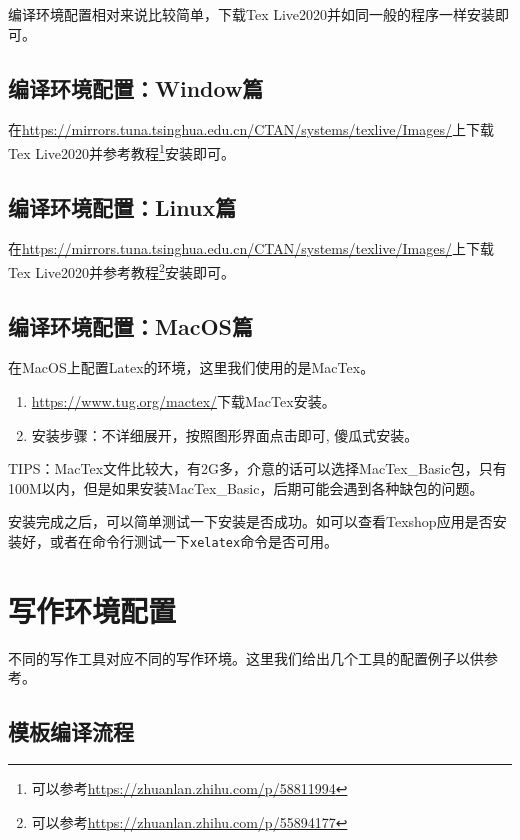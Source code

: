 编译环境配置相对来说比较简单，下载Tex Live2020并如同一般的程序一样安装即可。

\subsection{编译环境配置：Window篇}

在\url{https://mirrors.tuna.tsinghua.edu.cn/CTAN/systems/texlive/Images/}上下载Tex Live2020并参考教程\footnote{可以参考\url{https://zhuanlan.zhihu.com/p/58811994}}安装即可。

\subsection{编译环境配置：Linux篇}

在\url{https://mirrors.tuna.tsinghua.edu.cn/CTAN/systems/texlive/Images/}上下载Tex Live2020并参考教程\footnote{可以参考\url{https://zhuanlan.zhihu.com/p/55894177}}安装即可。


\subsection{编译环境配置：MacOS篇}

在MacOS上配置Latex的环境，这里我们使用的是MacTex。

\begin{enumerate}
	\item \url{https://www.tug.org/mactex/}下载MacTex安装。
	\item 安装步骤：不详细展开，按照图形界面点击即可, 傻瓜式安装。
\end{enumerate}

TIPS：MacTex文件比较大，有2G多，介意的话可以选择MacTex\_Basic包，只有100M以内，但是如果安装MacTex\_Basic，后期可能会遇到各种缺包的问题。


安装完成之后，可以简单测试一下安装是否成功。如可以查看Texshop应用是否安装好，或者在命令行测试一下\texttt{xelatex}命令是否可用。

\section{写作环境配置}

不同的写作工具对应不同的写作环境。这里我们给出几个工具的配置例子以供参考。

\subsection{模板编译流程}

